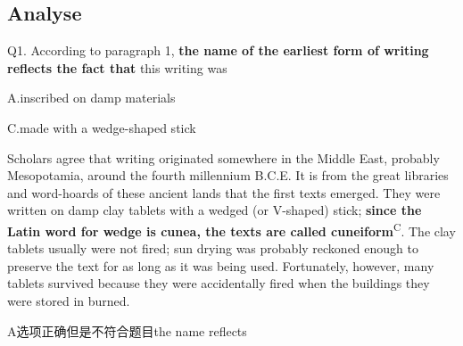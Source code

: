 \subsection{Analyse}

\begin{blk}
    \begin{qst}
        Q1. According to paragraph 1, \textbf{the name of the earliest form of writing reflects the fact that} this writing was
    \end{qst}

    \begin{chc}
        A.inscribed on damp materials

        C.made with a wedge-shaped stick
    \end{chc}

    \begin{psgq}
        Scholars agree that writing originated somewhere in the Middle East, probably Mesopotamia, around the fourth millennium B.C.E. It is from the great libraries and word-hoards of these ancient lands that the first texts emerged. They were written on damp clay tablets with a wedged (or V-shaped) stick; \textbf{since the Latin word for wedge is cunea, the texts are called cuneiform}\textsuperscript{C}. The clay tablets usually were not fired; sun drying was probably reckoned enough to preserve the text for as long as it was being used. Fortunately, however, many tablets survived because they were accidentally fired when the buildings they were stored in burned.
    \end{psgq}

    \begin{nlz}
        A选项正确但是不符合题目the name reflects
    \end{nlz}
\end{blk}

